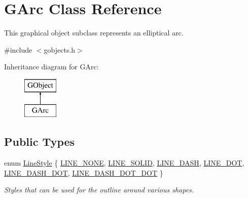 \hypertarget{classsgl_1_1GArc}{}\section{G\+Arc Class Reference}
\label{classsgl_1_1GArc}


This graphical object subclass represents an elliptical arc.  




{\ttfamily \#include $<$gobjects.\+h$>$}

Inheritance diagram for G\+Arc\+:\begin{figure}[H]
\begin{center}
\leavevmode
\includegraphics[height=2.000000cm]{classsgl_1_1GArc}
\end{center}
\end{figure}
\subsection*{Public Types}
\begin{DoxyCompactItemize}
\item 
enum \mbox{\hyperlink{classsgl_1_1GObject_a86e0f5648542856159bb40775c854aa7}{Line\+Style}} \{ \mbox{\hyperlink{classsgl_1_1GObject_a86e0f5648542856159bb40775c854aa7acbc84bd5232621834ed31f44d457c1eb}{L\+I\+N\+E\+\_\+\+N\+O\+NE}}, 
\mbox{\hyperlink{classsgl_1_1GObject_a86e0f5648542856159bb40775c854aa7a700c78bc2cd76acaab26651bf7b4941f}{L\+I\+N\+E\+\_\+\+S\+O\+L\+ID}}, 
\mbox{\hyperlink{classsgl_1_1GObject_a86e0f5648542856159bb40775c854aa7a9ccba0845f785d81d07b333ae1aad84e}{L\+I\+N\+E\+\_\+\+D\+A\+SH}}, 
\mbox{\hyperlink{classsgl_1_1GObject_a86e0f5648542856159bb40775c854aa7a8e811c096cb941997f0bfda168bb6df3}{L\+I\+N\+E\+\_\+\+D\+OT}}, 
\mbox{\hyperlink{classsgl_1_1GObject_a86e0f5648542856159bb40775c854aa7ada15a2e3d737b2db7706d8300f91b89d}{L\+I\+N\+E\+\_\+\+D\+A\+S\+H\+\_\+\+D\+OT}}, 
\mbox{\hyperlink{classsgl_1_1GObject_a86e0f5648542856159bb40775c854aa7aabf4053a73eafa7ba2b7e6d664c74c1d}{L\+I\+N\+E\+\_\+\+D\+A\+S\+H\+\_\+\+D\+O\+T\+\_\+\+D\+OT}}
 \}
\begin{DoxyCompactList}\small\item\em Styles that can be used for the outline around various shapes. \end{DoxyCompactList}\end{DoxyCompactItemize}
